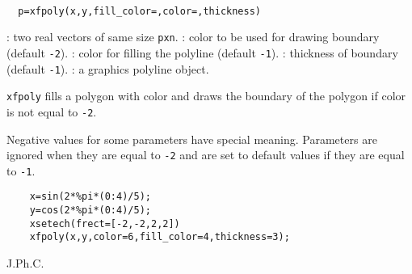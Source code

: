 \begin{mandesc}
  \\
\end{mandesc}
\begin{calling_sequence}
\begin{verbatim}
  p=xfpoly(x,y,fill_color=,color=,thickness)
\end{verbatim}
\end{calling_sequence}
\begin{parameters}
  \begin{varlist}
    : two real vectors of same size \verb!pxn!.
    : color to be used for drawing boundary (default \verb!-2!).
    : color for filling the polyline (default \verb!-1!).
    : thickness of boundary (default \verb!-1!).
    : a graphics polyline object.
  \end{varlist}
\end{parameters}

\begin{mandescription}
  \verb!xfpoly! fills a polygon with color and draws the boundary of
  the polygon if color is not equal to \verb!-2!.

  Negative values for some parameters have special meaning.
  Parameters are ignored when they are equal to \verb!-2!
  and are set to default values if they are equal to \verb!-1!.
\end{mandescription}

\begin{examples}
  \begin{Verbatim}
    x=sin(2*%pi*(0:4)/5);
    y=cos(2*%pi*(0:4)/5);
    xsetech(frect=[-2,-2,2,2])
    xfpoly(x,y,color=6,fill_color=4,thickness=3);
  \end{Verbatim}
\end{examples}

\begin{manseealso}
    
\end{manseealso}


\begin{authors}
  J.Ph.C.

\end{authors}
